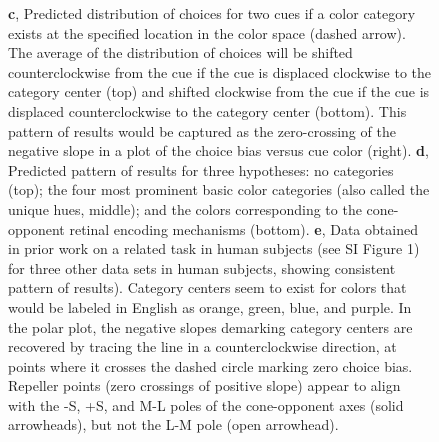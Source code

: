 \begin{figure}
\begin{fullwidth}
{	\textbf{c}, Predicted distribution of choices for two cues if a color category exists at the specified location in the color space (dashed arrow). 
	The average of the distribution of choices will be shifted counterclockwise from the cue if the cue is displaced clockwise to the category center (top) and shifted clockwise from the cue if the cue is displaced counterclockwise to the category center (bottom). This pattern of results would be captured as the zero-crossing of the negative slope in a plot of the choice bias versus cue color (right). 
	\textbf{d}, Predicted pattern of results for three hypotheses: no categories (top); the four most prominent basic color categories (also called the unique hues, middle); and the colors corresponding to the cone-opponent retinal encoding mechanisms (bottom). 
	\textbf{e}, Data obtained in prior work on a related task in human subjects (see SI Figure 1) for three other data sets in human subjects, showing consistent pattern of results). 
    Category centers seem to exist for colors that would be labeled in English as orange, green, blue, and purple. 
	In the polar plot, the negative slopes demarking category centers are recovered by tracing the line in a counterclockwise direction, at points where it crosses the dashed circle marking zero choice bias.
    Repeller points (zero crossings of positive slope) appear to align with the -S, +S, and M-L poles of the cone-opponent axes (solid arrowheads), but not the L-M pole (open arrowhead).} 
    \label{fig:ParadigmAnalysisPredictions}
    \end{fullwidth}
\end{figure}

